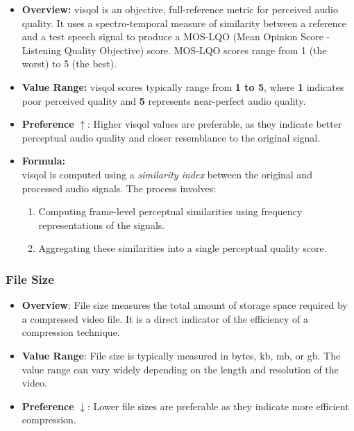 \begin{itemize}
    \item \textbf{Overview:} \gls{visqol} is an objective, full-reference metric for perceived audio quality. It uses a spectro-temporal measure of similarity between a reference and a test speech signal to produce a MOS-LQO (Mean Opinion Score - Listening Quality Objective) score. MOS-LQO scores range from 1 (the worst) to 5 (the best).

    \item \textbf{Value Range:} \gls{visqol} scores typically range from \textbf{1 to 5}, where \textbf{1} indicates poor perceived quality and \textbf{5} represents near-perfect audio quality.

    \item \textbf{Preference} $\uparrow$: Higher \gls{visqol} values are preferable, as they indicate better perceptual audio quality and closer resemblance to the original signal.

    \item \textbf{Formula:} \\
    \gls{visqol} is computed using a \textit{similarity index} between the original and processed audio signals. The process involves:
    \begin{enumerate}
        \item Computing frame-level perceptual similarities using frequency representations of the signals.
        \item Aggregating these similarities into a single perceptual quality score.
    \end{enumerate}
\end{itemize}

\subsubsection{File Size}
            \begin{itemize}
                \item \textbf{Overview}: File size measures the total amount of storage space required by a compressed video file. It is a direct indicator of the efficiency of a compression technique.
                \item \textbf{Value Range}: File size is typically measured in bytes, \gls{kb}, \gls{mb}, or \gls{gb}. The value range can vary widely depending on the length and resolution of the video.
                \item \textbf{Preference} $\downarrow$: Lower file sizes are preferable as they indicate more efficient compression.
            \end{itemize}


    \pagebreak

